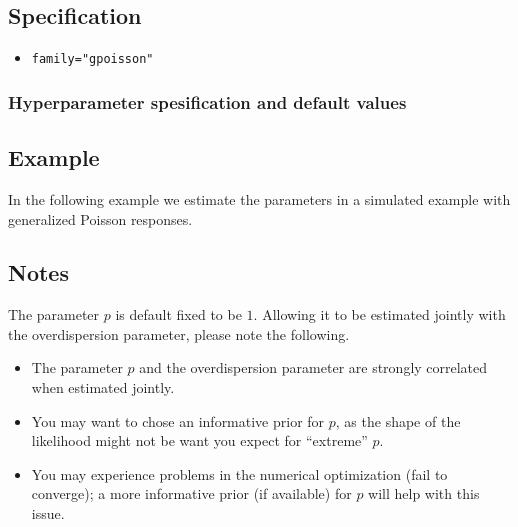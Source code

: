\documentclass[a4paper,11pt]{article}
\begin{document}
\subsection*{Specification}

\begin{itemize}
\item \texttt{family="gpoisson"}
\end{itemize}


\subsubsection*{Hyperparameter spesification and default values}

    
\subsection*{Example}

In the following example we estimate the parameters in a simulated
example with generalized Poisson responses.



\subsection*{Notes}

The parameter $p$ is default fixed to be $1$. Allowing it to be
estimated jointly with the overdispersion parameter, please note the
following.
\begin{itemize}
\item The parameter $p$ and the overdispersion parameter are strongly
    correlated when estimated jointly.
\item You may want to chose an informative prior for $p$, as the shape
    of the likelihood might not be want you expect for ``extreme'' $p$.
\item You may experience problems in the numerical optimization (fail
    to converge); a more informative prior (if available) for $p$ will
    help with this issue.
\end{itemize}
\end{document}
